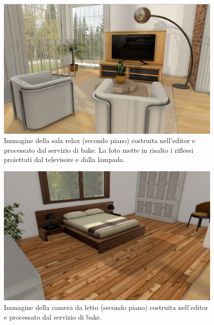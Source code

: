 \begin{figure}[htb]
 \centering
 \includegraphics[width=1\linewidth]{images/chapter_prove_sperimentali/scena_2_pianosup_hobby.png}\hfill
 \caption[Ambiente virtuale: Sala relax secondo piano, veduta 2]{Immagine della sala relax (secondo piano) costruita nell'editor e processato dal servizio di bake. La foto mette in risalto i riflessi proiettati dal televisore e dalla lampada.}
 \label{fig:prove_sperimentali_qualita_visiva_scena_hobby2}
\end{figure}
\begin{figure}[htb]
 \centering
 \includegraphics[width=1\linewidth]{images/chapter_prove_sperimentali/scena_1_pianosup_letto.png}\hfill
 \caption[Ambiente virtuale: Camera letto secondo piano]{Immagine della camera da letto (secondo piano) costruita nell'editor e processato dal servizio di bake.}
 \label{fig:prove_sperimentali_qualita_visiva_scena_hobby3}
\end{figure}
